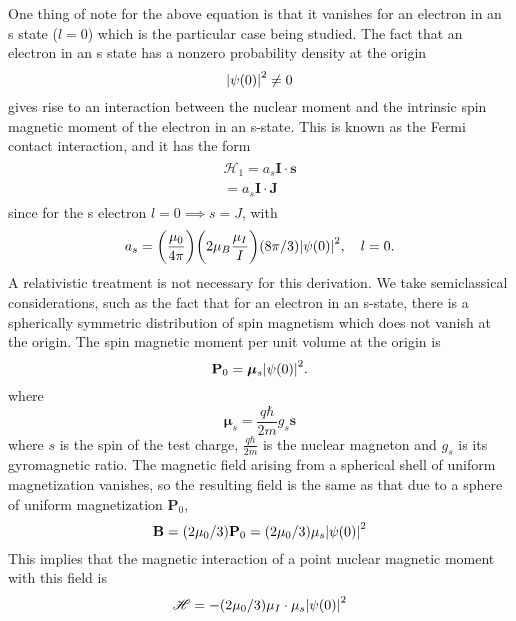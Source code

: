 One thing of note for the above equation is that it vanishes for an electron in an s state ($l=0$) which is the particular case being studied. The fact that an electron in an s state has a nonzero probability density at the origin 
\begin{equation}
    \abs{\psi(0)}^2\neq 0
\end{equation}
gives rise to an interaction between the nuclear moment and the intrinsic spin magnetic moment of the electron in an s-state. This is known as the Fermi contact interaction, and it has the form
\begin{align}
    \begin{split}
        \mathscr{H}_1=a_s\mathbf{I}\cdot\mathbf{s}\\
       = a_s\mathbf{I}\cdot\mathbf{J}
    \end{split}
\end{align}
since for the s electron \(l=0 \implies s=J\), with
\begin{equation}
    a_s = \bigg(\frac{\mu_0}{4\pi}\bigg)\bigg(2\mu_B \frac{\mu_I}{I}\bigg)
    (8\pi/3)\abs{\psi(0)}^2,\quad l=0.
\end{equation}
A relativistic treatment is not necessary for this derivation. We take semiclassical considerations, such as the fact that for an electron in an s-state, there is a spherically symmetric distribution of spin magnetism which does not vanish at the origin. The spin magnetic moment per unit volume at the origin is \cite{woodgate3}
\begin{equation}
    \mathbf{P}_0= \boldsymbol{\mu}_s\abs{\psi (0)}^2.
\end{equation}
where \cite{drakespringer2006}
\begin{equation}
    \boldsymbol{\mu}_s=\frac{q\hbar}{2m}g_s\mathbf{s}
\end{equation}
where $s$ is the spin of the test charge, $\frac{q\hbar}{2m}$ is the nuclear magneton and $g_s$ is its gyromagnetic ratio. The magnetic field arising from a spherical shell of uniform magnetization vanishes, so the resulting field is the same as that due to a sphere of uniform magnetization \(\mathbf{P}_0\),
\begin{equation}
    \mathbf{B}= (2\mu_0/3)\mathbf{P}_0=(2\mu_0/3)\mathbf{\mu}_s
    \abs{\psi(0)}^2
\end{equation}
This implies that the magnetic interaction of a point nuclear magnetic moment with this field is
\begin{equation}
    \mathscr{H}=-(2\mu_0/3)\mu_I\cdot \mu_s \abs{\psi(0)}^2
\end{equation}

